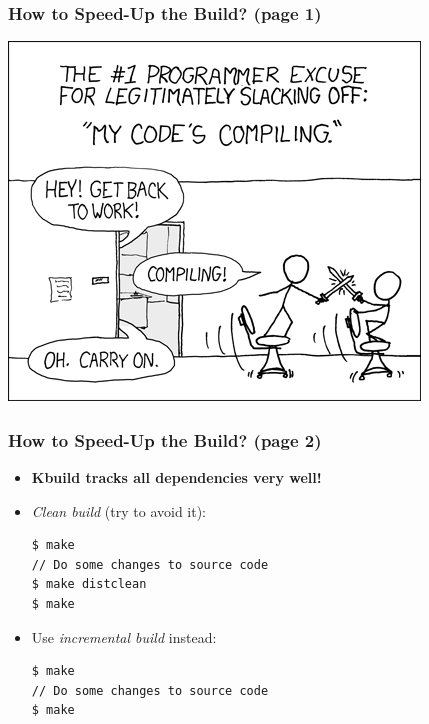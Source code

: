 \documentclass[aspectratio=169]{beamer}
\begin{document}
\begin{frame}
  \frametitle{How to Speed-Up the Build? (page 1)}
  \begin{center}
    \includegraphics[scale=0.45]{images/compiling.png}
  \end{center}
\end{frame}

\begin{frame}[fragile]
  \frametitle{How to Speed-Up the Build? (page 2)}
  \begin{itemize}
    \item \alert{\textbf{Kbuild tracks all dependencies very well!}}
    \item \textit{Clean build} (try to avoid it):
    \begin{verbatim}
$ make
// Do some changes to source code
$ make distclean
$ make
    \end{verbatim}
    \item Use \textit{incremental build} instead:
    \begin{verbatim}
$ make
// Do some changes to source code
$ make
    \end{verbatim}
  \end{itemize}
  \vspace*{-3mm}
\end{frame}
\end{document}
